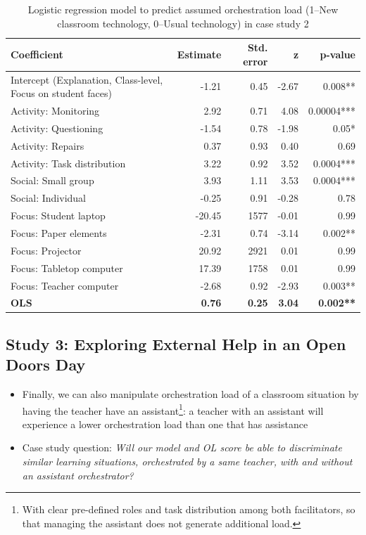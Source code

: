 \documentclass[10pt,journal,compsoc]{IEEEtran}
\begin{document}
\begin{table}[!t]
\caption{Logistic regression model to predict assumed orchestration load (1--New classroom technology, 0--Usual technology) in case study 2}
\label{tab:case2results}
\centering
\begin{tabular}{|p{2.8cm}||r|r|r|r|}
\hline
Coefficient & Estimate & Std. error & z & p-value\\
\hline
\hline
Intercept (Explanation, Class-level, Focus on student faces) & -1.21 & 0.45 & -2.67 & 0.008** \\
Activity: Monitoring & 2.92 & 0.71 & 4.08 & 0.00004*** \\
Activity: Questioning & -1.54 & 0.78 & -1.98 & 0.05* \\
Activity: Repairs & 0.37 & 0.93 & 0.40 & 0.69 \\
Activity: Task distribution & 3.22 & 0.92 & 3.52 & 0.0004*** \\
Social: Small group & 3.93 & 1.11 & 3.53 & 0.0004*** \\
Social: Individual & -0.25 & 0.91 & -0.28 & 0.78 \\
Focus: Student laptop & -20.45 & 1577 & -0.01 & 0.99 \\
Focus: Paper elements & -2.31 & 0.74 & -3.14 & 0.002** \\
Focus: Projector & 20.92 & 2921 & 0.01 & 0.99 \\
Focus: Tabletop computer & 17.39 & 1758 & 0.01 & 0.99 \\
Focus: Teacher computer & -2.68 & 0.92 & -2.93 & 0.003** \\
\textbf{OLS} & \textbf{0.76} & \textbf{0.25} & \textbf{3.04} & \textbf{0.002**} \\
\hline
\end{tabular}
\end{table}


\subsection{Study 3: Exploring External Help in an Open Doors Day}

\begin{itemize}
\item Finally, we can also manipulate orchestration load of a classroom situation by having the teacher have an assistant\footnote{With clear pre-defined roles and task distribution among both facilitators, so that managing the assistant does not generate additional load.}: a teacher with an assistant will experience a lower orchestration load than one that has assistance
\item Case study question: \textit{Will our model and OL score be able to discriminate similar learning situations, orchestrated by a same teacher, with and without an assistant orchestrator?}
\end{itemize}
\end{document}
